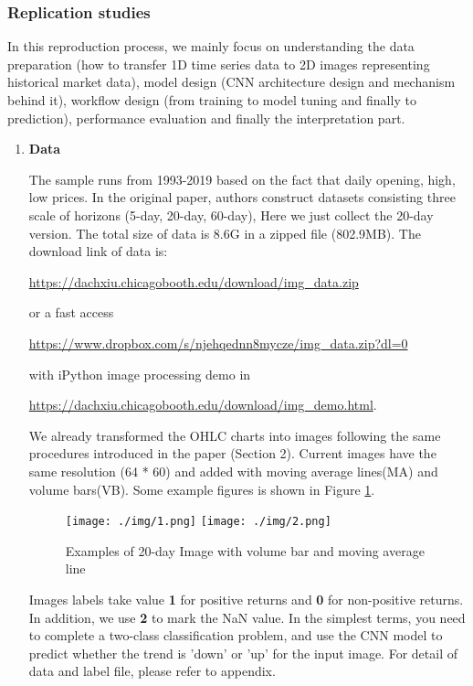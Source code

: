 \documentclass[11pt]{article}
\begin{document}
\subsubsection{Replication studies}
In this reproduction process, we mainly focus on understanding the data preparation (how to transfer 1D time series data to 2D images representing historical market data), model design (CNN architecture design and mechanism behind it), workflow design (from training to model tuning and finally to prediction), performance evaluation and finally the interpretation part.

\begin{enumerate}
    \item \textbf{Data}
    
    The sample runs from 1993-2019 based on the fact that daily opening, high, low prices. In the original paper, authors construct datasets consisting three scale of horizons (5-day, 20-day, 60-day), Here we just collect the 20-day version. The total size of data is 8.6G in a zipped file (802.9MB). The download link of data is: 
    
    \url{https://dachxiu.chicagobooth.edu/download/img_data.zip}
    
    or a fast access 
    
    \url{https://www.dropbox.com/s/njehqednn8mycze/img_data.zip?dl=0}
    
    with iPython image processing demo in 
    
    \url{https://dachxiu.chicagobooth.edu/download/img_demo.html}. 

    We already transformed the OHLC charts into images following the same procedures introduced in the paper (Section 2). Current images have the same resolution (64 * 60) and added with moving average lines(MA) and volume bars(VB). Some example figures is shown in Figure \ref{20-day image}.
    
    \begin{figure}
        \centering
        \texttt{[image: ./img/1.png]}
        \hspace{0.5in}
        \texttt{[image: ./img/2.png]}
        \caption{Examples of 20-day Image with volume bar and moving average line}
        \label{20-day image}
    \end{figure}


    Images labels take value \textbf{1} for positive returns and \textbf{0} for non-positive returns. In addition, we use \textbf{2} to mark the NaN value. In the simplest terms, you need to complete a two-class classification problem, and use the CNN model to predict whether the trend is 'down' or 'up' for the input image. For detail of data and label file, please refer to appendix.
    

\end{enumerate}
\end{document}
